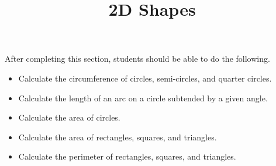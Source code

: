 \documentclass{ximera}
\title{2D Shapes}
\begin{document}
\begin{abstract} 
\end{abstract}

\maketitle

\begin{sectionOutcomes}
After completing this section, students should be able to do the following.

\begin{itemize}
	\item Calculate the circumference of circles, semi-circles, and quarter circles. 
    \item Calculate the length of an arc on a circle subtended by a given angle. 
    \item Calculate the area of circles.
    \item Calculate the area of rectangles, squares, and triangles.
    \item Calculate the perimeter of rectangles, squares, and triangles.

\end{itemize}
\end{sectionOutcomes}
\end{document}
